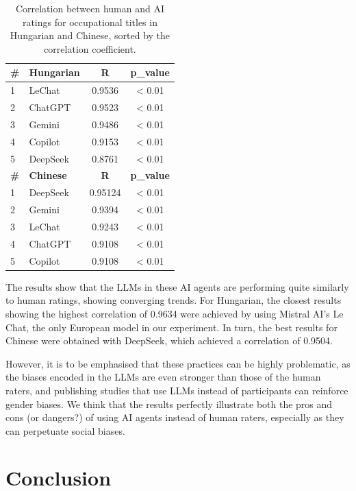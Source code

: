 \documentclass[10pt, a4paper]{article}
\begin{document}
\begin{table}
  \caption{Correlation between human and AI ratings for occupational titles in Hungarian and Chinese, sorted by the correlation coefficient.}
  \centering
  \begin{tabularx}{\columnwidth}{@{}l X c c@{}}
    \toprule
    \textbf{\#} & \textbf{Hungarian} & \textbf{R} & \textbf{p\_value} \\
    \midrule
    1 & LeChat   & 0.9536 & < 0.01 \\
    2 & ChatGPT  & 0.9523 & < 0.01 \\
    3 & Gemini   & 0.9486 & < 0.01 \\
    4 & Copilot  & 0.9153 & < 0.01 \\
    5 & DeepSeek & 0.8761 & < 0.01 \\
    \addlinespace
    \textbf{\#} & \textbf{Chinese} & \textbf{R} & \textbf{p\_value} \\
    \midrule
    1 & DeepSeek & 0.95124 & < 0.01 \\
    2 & Gemini   & 0.9394  & < 0.01 \\
    3 & LeChat   & 0.9243  & < 0.01 \\
    4 & ChatGPT  & 0.9108  & < 0.01 \\
    5 & Copilot  & 0.9108  & < 0.01 \\
    \bottomrule
  \end{tabularx}
  \label{tab:correlation}
\end{table}

The results show that the LLMs in these AI agents are performing quite similarly to human ratings, showing converging trends. For Hungarian, the closest results showing the highest correlation of 0.9634 were achieved by using Mistral AI's Le Chat, the only European model in our experiment. In turn, the best results for Chinese were obtained with DeepSeek, which achieved a correlation of 0.9504.

However, it is to be emphasised that these practices can be highly problematic, as the biases encoded in the LLMs are even stronger than those of the human raters, and publishing studies that use LLMs instead of participants can reinforce gender biases. We think that the results perfectly illustrate both the pros and cons (or dangers?) of using AI agents instead of human raters, especially as they can perpetuate social biases.



\section{Conclusion}
\end{document}
